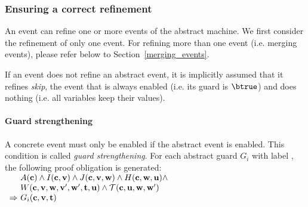 \subsubsection{Ensuring a correct refinement}
\label{refinement_proof_obligations}
An event can refine one or more events of the abstract machine.
We first consider the refinement of only one event. 
For refining more than one event (i.e. merging events), please refer below to Section~\ref{merging_events}.

If an event does not refine an abstract event, it is implicitly assumed that it refines \emph{skip}, the
  event that is always enabled (i.e. its guard is $\btrue$) and does nothing (i.e. all variables keep their
  values).

\paragraph{Guard strengthening}
\label{guard_strengthening}
A concrete event must only be enabled if the abstract event is enabled.
This condition is called \emph{guard strengthening}.
For each abstract guard $G_i$ with label , the following
proof obligation is generated:
%
{}%
{$\begin{array}{r@{\ }l}
   & \axioms \land \absinvariants \land \concinvariants
  \land \concguards \land \\
  & \witnesspred \land \bapred  \\
  \limp & G_i(\allconstants,\absvariables,\absparameters)
  \end{array}$}

